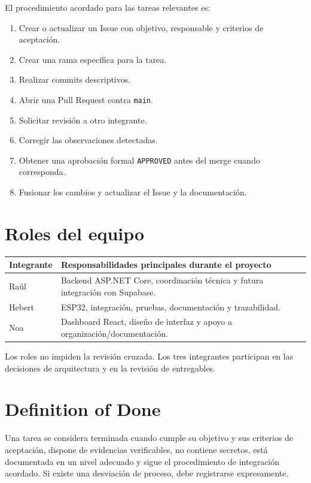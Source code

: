 \documentclass[11pt,a4paper,oneside]{report}
\begin{document}
El procedimiento acordado para las tareas relevantes es:

\begin{enumerate}
\item Crear o actualizar un Issue con objetivo, responsable y criterios de aceptación.
\item Crear una rama específica para la tarea.
\item Realizar commits descriptivos.
\item Abrir una Pull Request contra \texttt{main}.
\item Solicitar revisión a otro integrante.
\item Corregir las observaciones detectadas.
\item Obtener una aprobación formal \texttt{APPROVED} antes del merge cuando corresponda.
\item Fusionar los cambios y actualizar el Issue y la documentación.
\end{enumerate}

\section{Roles del equipo}

\begin{tabularx}{\linewidth}{@{}p{3.2cm}X@{}}
\toprule
\textbf{Integrante} & \textbf{Responsabilidades principales durante el proyecto} \\
\midrule
Raúl & Backend ASP.NET Core, coordinación técnica y futura integración con Supabase. \\
Hebert & ESP32, integración, pruebas, documentación y trazabilidad. \\
Noa & Dashboard React, diseño de interfaz y apoyo a organización/documentación. \\
\bottomrule
\end{tabularx}

Los roles no impiden la revisión cruzada. Los tres integrantes participan en las decisiones de arquitectura y en la revisión de entregables.

\section{Definition of Done}

Una tarea se considera terminada cuando cumple su objetivo y sus criterios de aceptación, dispone de evidencias verificables, no contiene secretos, está documentada en un nivel adecuado y sigue el procedimiento de integración acordado. Si existe una desviación de proceso, debe registrarse expresamente.
\end{document}
